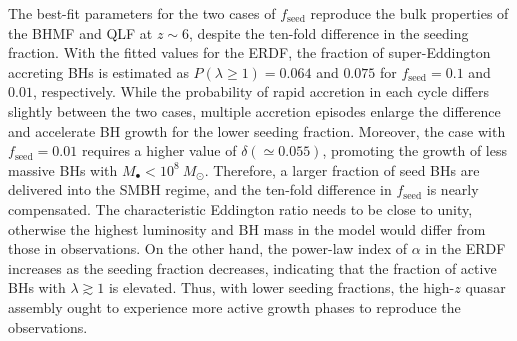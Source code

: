 \documentclass[twocolumn, twocolappendix]{aastex63}
\newcommand{\Msun}{M_\odot}
\newcommand{\fseed}{f_\mathrm{seed}}
\begin{document}
\begin{CJK*}{UTF8}{gbsn}
The best-fit parameters for the two cases of $\fseed$ reproduce the bulk properties of the BHMF and QLF at $z\sim 6$,
despite the ten-fold difference in the seeding fraction.
With the fitted values for the ERDF, the fraction of super-Eddington accreting BHs is estimated as 
$P(\lambda \geq 1)=0.064$ and $0.075$ for $\fseed=0.1$ and $0.01$, respectively.
While the probability of rapid accretion in each cycle differs slightly between the two cases,
multiple accretion episodes enlarge the difference and accelerate BH growth for the lower seeding fraction.
Moreover, the case with $\fseed=0.01$ requires a higher value of $\delta (\simeq 0.055)$,
promoting the growth of less massive BHs with $M_\bullet <10^8~\Msun$.
Therefore, a larger fraction of seed BHs are delivered into the SMBH regime,
and the ten-fold difference in $\fseed$ is nearly compensated.
The characteristic Eddington ratio needs to be close to unity, otherwise the highest luminosity and BH mass
in the model would differ from those in observations.
On the other hand, the power-law index of $\alpha$ in the ERDF increases as the seeding fraction decreases,
indicating that the fraction of active BHs with $\lambda \gtrsim 1$ is elevated. 
Thus, with lower seeding fractions, the high-$z$ quasar assembly ought to experience more active growth phases to reproduce the observations.




\end{CJK*}
\end{document}
